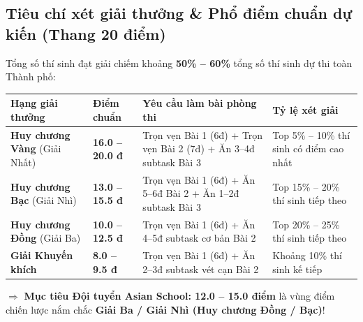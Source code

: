 \documentclass[11pt,a4paper]{article}
\begin{document}
\vspace{-0.15cm}
\subsection*{\color{AsianBlue}\small Tiêu chí xét giải thưởng \& Phổ điểm chuẩn dự kiến (Thang 20 điểm)}
Tổng số thí sinh đạt giải chiếm khoảng \textbf{50\% -- 60\%} tổng số thí sinh dự thi toàn Thành phố:

\vspace{-0.2cm}
\begin{center}
\footnotesize
\begin{tabular}{@{}p{3.2cm}p{2.4cm}p{6.4cm}p{4.8cm}@{}}
\toprule
\textbf{Hạng giải thưởng} & \textbf{Điểm chuẩn} & \textbf{Yêu cầu làm bài phòng thi} & \textbf{Tỷ lệ xét giải} \\ \midrule
\textbf{\color{orange!90!black}Huy chương Vàng} (Giải Nhất) & \textbf{16.0 -- 20.0 đ} & Trọn vẹn Bài 1 (6đ) + Trọn vẹn Bài 2 (7đ) + Ăn 3--4đ subtask Bài 3 & Top 5\% -- 10\% thí sinh có điểm cao nhất \\
\addlinespace[2pt]
\textbf{\color{gray!80!black}Huy chương Bạc} (Giải Nhì) & \textbf{13.0 -- 15.5 đ} & Trọn vẹn Bài 1 (6đ) + Ăn 5--6đ Bài 2 + Ăn 1--2đ subtask Bài 3 & Top 15\% -- 20\% thí sinh tiếp theo \\
\addlinespace[2pt]
\textbf{\color{brown!80!black}Huy chương Đồng} (Giải Ba) & \textbf{10.0 -- 12.5 đ} & Trọn vẹn Bài 1 (6đ) + Ăn 4--5đ subtask cơ bản Bài 2 & Top 20\% -- 25\% thí sinh tiếp theo \\
\addlinespace[2pt]
\textbf{Giải Khuyến khích} & \textbf{8.0 -- 9.5 đ} & Trọn vẹn Bài 1 (6đ) + Ăn 2--3đ subtask vét cạn Bài 2 & Khoảng 10\% thí sinh kế tiếp \\ \bottomrule
\end{tabular}
\end{center}

\vspace{-0.15cm}
\noindent
$\Longrightarrow$ \textbf{\color{AsianDarkBlue}Mục tiêu Đội tuyển Asian School: 12.0 -- 15.0 điểm} là vùng điểm chiến lược nắm chắc \textbf{Giải Ba / Giải Nhì (Huy chương Đồng / Bạc)}!

\vspace{0.2cm}
\end{document}
